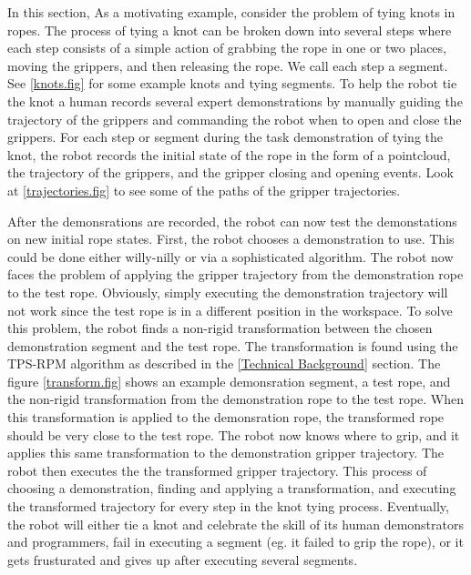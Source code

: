 In this section,
As a motivating example, consider the problem of tying knots in ropes. The process of tying a knot can be broken down into several steps where each step consists of a simple action of grabbing the rope in one or two places, moving the grippers, and then releasing the rope. We call each step a segment. See \ref{knots.fig} for some example knots and tying segments. To help the robot tie the knot a human records several expert demonstrations by manually guiding the trajectory of the grippers and commanding the robot when to open and close the grippers. For each step or segment during the task demonstration of tying the knot, the robot records the initial state of the rope in the form of a pointcloud, the trajectory of the grippers, and the gripper closing and opening events. Look at \ref{trajectories.fig} to see some of the paths of the gripper trajectories.

After the demonsrations are recorded, the robot can now test the demonstations on new initial rope states. First, the robot chooses a demonstration to use. This could be done either willy-nilly or via a sophisticated algorithm. The robot now faces the problem of applying the gripper trajectory from the demonstration rope to the test rope. Obviously, simply executing the demonstration trajectory will not work since the test rope is in a different position in the workspace. To solve this problem, the robot finds a non-rigid transformation between the chosen demonstration segment and the test rope. The transformation is found using the TPS-RPM algorithm as described in the \ref{Technical Background} section. The figure \ref{transform.fig} shows an example demonsration segment, a test rope, and the non-rigid transformation from the demonstration rope to the test rope. When this transformation is applied to the demonsration rope, the transformed rope should be very close to the test rope. The robot now knows where to grip, and it applies this same transformation to the demonstration gripper trajectory. The robot then executes the the transformed gripper trajectory. This process of choosing a demonstration, finding and applying a transformation, and executing the transformed trajectory for every step in the knot tying process. Eventually, the robot will either tie a knot and celebrate the skill of its human demonstrators and programmers, fail in executing a segment (eg. it failed to grip the rope), or it gets frusturated and gives up after executing several segments.
